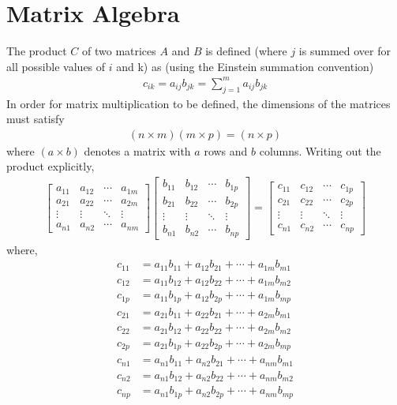 \chapter{Matrix Algebra}
\thispagestyle{fancy}
The product $C$ of two matrices $A$ and $B$ is defined (where $j$ is summed over for all possible values of $i$ and k) as (using the Einstein summation convention)
\begin{align}
c_{ik}=a_{ij}b_{jk} = \sum_{j=1}^{m}a_{ij}b_{jk}
\end{align}
In order for matrix multiplication to be defined, the dimensions of the matrices must satisfy
\begin{align}
(n\times m)(m\times p)=(n\times p)
\end{align}
where $(a \times b)$ denotes a matrix with $a$ rows and $b$ columns. Writing out the product explicitly,
\begin{align}
\begin{bmatrix}
a_{11} & a_{12} & \cdots & a_{1m} \\
a_{21} & a_{22} & \cdots & a_{2m} \\
\vdots & \vdots & \ddots & \vdots \\
a_{n1} & a_{n2} & \cdots & a_{nm}
\end{bmatrix}
\begin{bmatrix}
b_{11} & b_{12} & \cdots & b_{1p} \\
b_{21} & b_{22} & \cdots & b_{2p} \\
\vdots & \vdots & \ddots & \vdots \\
b_{n1} & b_{n2} & \cdots & b_{np}
\end{bmatrix}
=\begin{bmatrix}
c_{11} & c_{12} & \cdots & c_{1p} \\
c_{21} & c_{22} & \cdots & c_{2p} \\
\vdots & \vdots & \ddots & \vdots \\
c_{n1} & c_{n2} & \cdots & c_{np}
\end{bmatrix}
\end{align}
where,
\begin{align}
c_{11}	&=  a_{11}b_{11}+a_{12}b_{21}+\cdots+a_{1m}b_{m1}	\\
c_{12}	&=	a_{11}b_{12}+a_{12}b_{22}+\cdots+a_{1m}b_{m2}	\\
c_{1p}	&=	a_{11}b_{1p}+a_{12}b_{2p}+\cdots+a_{1m}b_{mp}	\\
c_{21}	&=	a_{21}b_{11}+a_{22}b_{21}+\cdots+a_{2m}b_{m1}	\\
c_{22}	&=	a_{21}b_{12}+a_{22}b_{22}+\cdots+a_{2m}b_{m2}	\\
c_{2p}	&=	a_{21}b_{1p}+a_{22}b_{2p}+\cdots+a_{2m}b_{mp}	\\
c_{n1}	&=	a_{n1}b_{11}+a_{n2}b_{21}+\cdots+a_{nm}b_{m1}	\\
c_{n2}	&=	a_{n1}b_{12}+a_{n2}b_{22}+\cdots+a_{nm}b_{m2}	\\
c_{np}	&=	a_{n1}b_{1p}+a_{n2}b_{2p}+\cdots+a_{nm}b_{mp}
\end{align}
